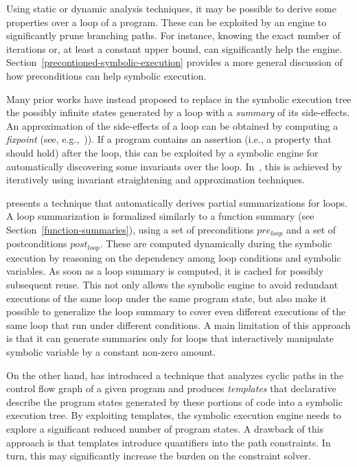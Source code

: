 Using static or dynamic analysis techniques, it may be possible to derive some properties over a loop of a program. These can be exploited by an engine to significantly prune branching paths. For instance, knowing the exact number of iterations or, at least a constant upper bound, can significantly help the engine. Section~\ref{precontioned-symbolic-execution} provides a more general discussion of how preconditions can help symbolic execution.

Many prior works have instead proposed to replace in the symbolic execution tree the possibly infinite states generated by a loop with a {\em summary} of its side-effects. An approximation of the side-effects of a loop can be obtained by computing a {\em fixpoint} (see, e.g.,~\cite{KKM-USEC05,BNS-SP06,CFB-ACSAC06})). If a program contains an assertion (i.e., a property that should hold) after the loop, this can be exploited by a symbolic engine for automatically discovering some invariants over the loop. In~\cite{PV-SPIN04}, this is achieved by iteratively using invariant straightening and approximation techniques. 

\cite{GL-ISSTA11} presents a technique that automatically derives partial summarizations for loops. A loop summarization is formalized similarly to a function summary (see Section~\ref{function-summaries}), using a set of preconditions $pre_{loop}$ and a set of postconditions $post_{loop}$. These are computed dynamically during the symbolic execution by reasoning on the dependency among loop conditions and symbolic variables. As soon as a loop summary is computed, it is cached for possibly subsequent reuse. This not only allows the symbolic engine to avoid redundant executions of the same loop under the same program state, but also make it possible to generalize the loop summary to cover even different executions of the same loop that run under different conditions. A main limitation of this approach is that it can generate summaries only for loops that interactively manipulate symbolic variable by a constant non-zero amount.

On the other hand, \cite{SST-ATVA13} has introduced a technique that analyzes cyclic paths in the control flow graph of a given program and produces {\em templates} that declarative describe the program states generated by these portions of code into a symbolic execution tree. By exploiting templates, the symbolic execution engine needs to explore a significant reduced number of program states. A drawback of this approach is that templates introduce quantifiers into the path constraints. In turn, this may significantly increase the burden on the constraint solver.

